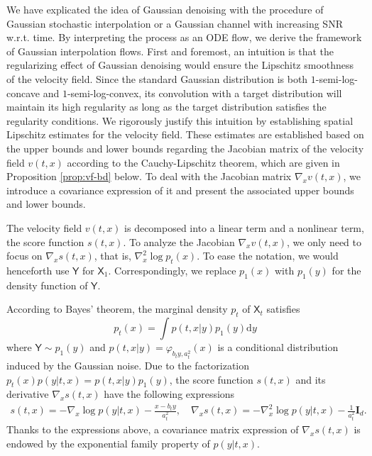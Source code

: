 \documentclass[twoside,11pt]{article}
\def\rmI{{\mathbf{I}}}
\newcommand{\diff}{\mathrm{d}}
\numberwithin{equation}{section}
\begin{document}
We have explicated the idea of Gaussian denoising with the procedure of Gaussian stochastic interpolation or a Gaussian channel with increasing SNR w.r.t. time.
By interpreting the process as an ODE flow, we derive the framework of Gaussian interpolation flows.
First and foremost, an intuition is that the regularizing effect of Gaussian denoising would ensure the Lipschitz smoothness of the velocity field.
Since the standard Gaussian distribution is both $1$-semi-log-concave and $1$-semi-log-convex, its convolution with a target distribution will maintain its high regularity as long as the target distribution satisfies the regularity conditions.
We rigorously justify this intuition by establishing spatial Lipschitz estimates for the velocity field.
These estimates are established based on
the upper bounds and lower bounds regarding the Jacobian matrix of the velocity field $v(t, x)$ according to the Cauchy-Lipschitz theorem, which are given in Proposition \ref{prop:vf-bd} below.
To deal with the Jacobian matrix $\nabla_x v(t, x)$, we introduce a covariance expression of it and present the associated upper bounds and lower bounds.


The velocity field $v(t, x)$ is decomposed into a linear term and a nonlinear term, the score function $s(t, x)$.
To analyze the Jacobian $\nabla_x v(t, x)$, we only need to focus on $\nabla_x s(t, x)$, that is, $\nabla^2_x \log p_t(x)$. To ease the notation, we would henceforth use $\mathsf{Y}$ %
for $\mathsf{X}_1$.
Correspondingly, we replace $p_1(x)$ with $p_1(y)$
for the density function of $\mathsf{Y}$.

According to  Bayes' theorem, the marginal density $p_t$ of $\mathsf{X}_t$ satisfies
$$p_t (x) = \int p(t, x | y) p_1(y) \diff y$$
where $\mathsf{Y} \sim p_1(y)$ and $p(t, x | y) = \varphi_{b_t y, a_t^2} (x)$ is a conditional distribution induced by the Gaussian noise.
Due to the factorization $p_t (x) p(y | t, x) = p(t, x | y) p_1(y)$,
the score function $s(t, x)$ and its derivative $\nabla_x s(t, x)$ have the following expressions
\begin{align*}
    s(t, x) = - \nabla_x \log p(y | t, x) - \tfrac{x - b_t y}{a_t^2} , \quad
    \nabla_x s(t, x) = - \nabla^2_x \log p(y | t, x) - \tfrac{1}{a_t^2}\rmI_d.
\end{align*}
Thanks to the expressions above, a covariance matrix expression of $\nabla_x s(t, x)$ is endowed by the exponential family property of $p(y | t, x)$.
\end{document}
